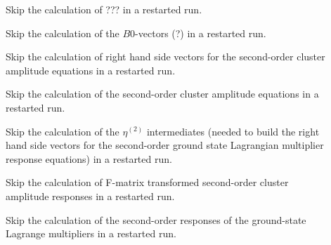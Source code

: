 \begin{description}
%
\item[] 
   Skip the calculation of ???
   in a restarted run.
%
\item[] 
   Skip the calculation of the $B0$-vectors (?)
   in a restarted run.
%
\item[] 
   Skip the calculation of right hand side vectors for the 
   second-order cluster amplitude equations
   in a restarted run.
%
\item[] 
   Skip the calculation of the 
   second-order cluster amplitude equations
   in a restarted run.
%
\item[] 
   Skip the calculation of the $\eta^{(2)}$ intermediates (needed
   to build the right hand side vectors for the second-order 
   ground state Lagrangian multiplier response equations) 
   in a restarted run.
%
\item[] 
   Skip the calculation of F-matrix transformed second-order
   cluster amplitude responses in a restarted run.
%
\item[]  
   Skip the calculation of the second-order responses of the 
   ground-state Lagrange multipliers in a restarted run.
\end{description}

